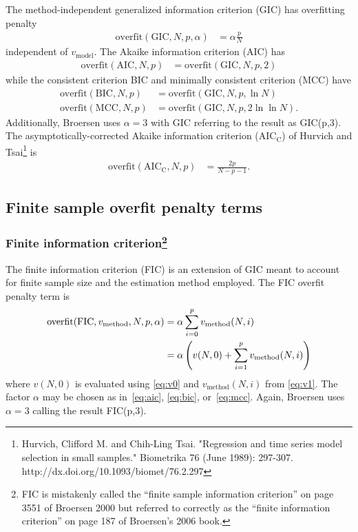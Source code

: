 \documentclass[12pt,letterpaper]{article}
\begin{document}
The method-independent generalized information criterion (GIC) has overfitting
penalty
\begin{align}
    \text{overfit}\!\left(\text{GIC},N,p,\alpha\right)
    &=
    \alpha \frac{p}{N}
\end{align}
independent of $v_\text{model}$.  The Akaike information criterion
(AIC) has
\begin{align}
    \label{eq:aic}
    \text{overfit}\!\left(\text{AIC},N,p\right)
    &=
    \text{overfit}\!\left(\text{GIC},N,p,2\right)
\end{align}
while the consistent criterion BIC and minimally consistent criterion
(MCC) have
\begin{align}
    \label{eq:bic}
    \text{overfit}\!\left(\text{BIC},N,p\right)
    &=
    \text{overfit}\!\left(\text{GIC},N,p,\ln{} N\right)
    \\
    \label{eq:mcc}
    \text{overfit}\!\left(\text{MCC},N,p\right)
    &=
    \text{overfit}\!\left(\text{GIC},N,p,2\ln\ln{}N\right)
    .
\end{align}
Additionally, Broersen uses $\alpha = 3$ with GIC referring to the result as
GIC(p,3).  The asymptotically-corrected Akaike information criterion
($\text{AIC}_\text{C}$) of Hurvich and Tsai\footnote{Hurvich, Clifford M. and
Chih-Ling Tsai. "Regression and time series model selection in small samples."
Biometrika 76 (June 1989): 297-307.  http://dx.doi.org/10.1093/biomet/76.2.297}
is
\begin{align}
    \text{overfit}\!\left(\text{AIC}_\text{C},N,p\right)
    &=
    \frac{2p}{N-p-1}
    .
\end{align}

\subsection*{Finite sample overfit penalty terms}

\subsubsection*{Finite information criterion\footnote{FIC is mistakenly called
the ``finite sample information criterion'' on page 3551 of Broersen 2000 but
referred to correctly as the ``finite information criterion'' on page 187 of
Broersen's 2006 book.}}

The finite information criterion (FIC) is an extension of GIC meant to account
for finite sample size and the estimation method employed.  The FIC overfit
penalty term is
\begin{align}
    \text{overfit}\!\left(\text{FIC},v_\text{method},N,p,\alpha\right)
    &=
    \alpha \sum_{i=0}^{p} v_\text{method}\!\left(N,i\right)
    \notag
    \\
    &=
    \alpha\left(
      v\!\left(N,0\right)
    + \sum_{i=1}^{p} v_\text{method}\!\left(N,i\right)
    \right)
\end{align}
where $v\!\left(N,0\right)$ is evaluated using \eqref{eq:v0} and
$v_\text{method}\!\left(N,i\right)$ from \eqref{eq:v1}.  The factor $\alpha$
may be chosen as in~\eqref{eq:aic}, \eqref{eq:bic}, or~\eqref{eq:mcc}.  Again,
Broersen uses $\alpha = 3$ calling the result FIC(p,3).
\end{document}
